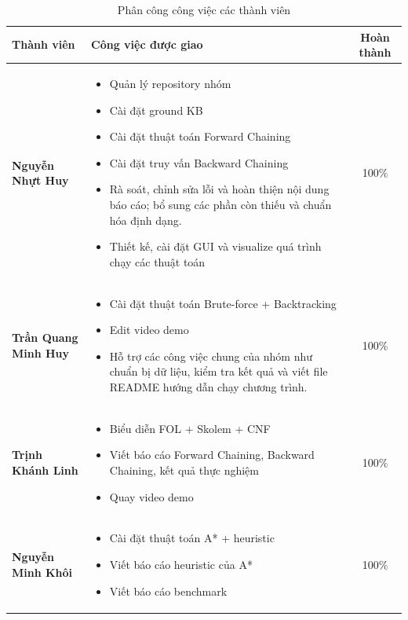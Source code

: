 \begin{table}[H]
\centering
\caption{Phân công công việc các thành viên}

\renewcommand{\arraystretch}{1.6}

\begin{tabular}{|m{5cm}|m{9cm}|c|}
\hline
\textbf{Thành viên} & \textbf{Công việc được giao} & \textbf{Hoàn thành} \\
\hline

\raggedright \textbf{Nguyễn Nhựt Huy} &
\begin{itemize}[leftmargin=*, noitemsep]
    \item Quản lý repository nhóm
    \item Cài đặt ground KB
    \item Cài đặt thuật toán Forward Chaining
    \item Cài đặt truy vấn Backward Chaining
    \item Rà soát, chỉnh sửa lỗi và hoàn thiện nội dung báo cáo; bổ sung các phần còn thiếu và chuẩn hóa định dạng. 
    \item Thiết kế, cài đặt GUI và visualize quá trình chạy các thuật toán
\end{itemize}
& 100\% \\
\hline

\raggedright \textbf{Trần Quang Minh Huy} &
\begin{itemize}[leftmargin=*, noitemsep]
    \item Cài đặt thuật toán Brute-force + Backtracking
    \item Edit video demo
    \item Hỗ trợ các công việc chung của nhóm như chuẩn bị dữ liệu, kiểm tra kết quả và viết file README hướng dẫn chạy chương trình.
\end{itemize}
& 100\% \\
\hline

\raggedright \textbf{Trịnh Khánh Linh} &
\begin{itemize}[leftmargin=*, noitemsep]
    \item Biểu diễn FOL + Skolem + CNF
    \item Viết báo cáo Forward Chaining, Backward Chaining, kết quả thực nghiệm
    \item Quay video demo
\end{itemize}
& 100\% \\
\hline

\raggedright \textbf{Nguyễn Minh Khôi} &
\begin{itemize}[leftmargin=*, noitemsep]
    \item Cài đặt thuật toán A* + heuristic
    \item Viết báo cáo heuristic của A*
    \item Viết báo cáo benchmark 
\end{itemize}
& 100\% \\
\hline

\end{tabular}
\end{table}


